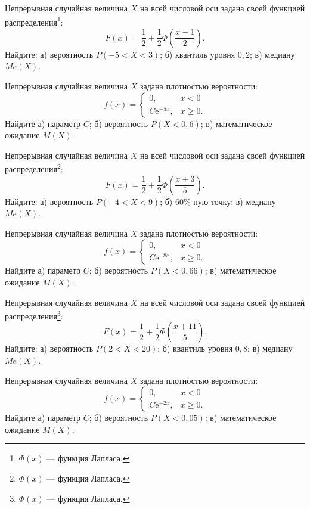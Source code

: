 \vfill

\newpage\setcounter{zad}{0}

\z Непрерывная случайная величина $X$ на всей числовой оси задана своей функцией распределения\footnote{$\Phi(x)$ --- функция Лапласа.}: $$ F(x) = \frac{1}{2} + \frac{1}{2}\Phi\left( \frac{x - 1}{2} \right). $$ Найдите: а) вероятность $P(-5 < X < 3)$; б) квантиль уровня $0{,}2$; в) медиану $Me(X)$.


\vfill

\z Непрерывная случайная величина $X$ задана плотностью вероятности: $$ f(x) = \begin{cases}0, & x < 0 \\ C\mathrm{e}^{-5x}, & x \geqslant 0.\end{cases} $$ Найдите а) параметр $C$; б) вероятность $P(X < 0{,}6)$; в) математическое ожидание $M(X)$.
 

\vfill

\newpage\setcounter{zad}{0}

\z Непрерывная случайная величина $X$ на всей числовой оси задана своей функцией распределения\footnote{$\Phi(x)$ --- функция Лапласа.}: $$ F(x) = \frac{1}{2} + \frac{1}{2}\Phi\left( \frac{x + 3}{5} \right). $$ Найдите: а) вероятность $P(-4 < X < 9)$; б) $60\%$-ную точку; в) медиану $Me(X)$.


\vfill

\z Непрерывная случайная величина $X$ задана плотностью вероятности: $$ f(x) = \begin{cases}0, & x < 0 \\ C\mathrm{e}^{-8x}, & x \geqslant 0.\end{cases} $$ Найдите а) параметр $C$; б) вероятность $P(X < 0{,}66)$; в) математическое ожидание $M(X)$.
 

\vfill

\newpage\setcounter{zad}{0}

\z Непрерывная случайная величина $X$ на всей числовой оси задана своей функцией распределения\footnote{$\Phi(x)$ --- функция Лапласа.}: $$ F(x) = \frac{1}{2} + \frac{1}{2}\Phi\left( \frac{x + 11}{5} \right). $$ Найдите: а) вероятность $P(2 < X < 20)$; б) квантиль уровня $0{,}8$; в) медиану $Me(X)$.


\vfill

\z Непрерывная случайная величина $X$ задана плотностью вероятности: $$ f(x) = \begin{cases}0, & x < 0 \\ C\mathrm{e}^{-2x}, & x \geqslant 0.\end{cases} $$ Найдите а) параметр $C$; б) вероятность $P(X < 0{,}05)$; в) математическое ожидание $M(X)$.
 

